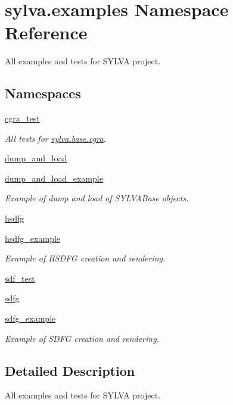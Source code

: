 \hypertarget{namespacesylva_1_1examples}{}\section{sylva.\+examples Namespace Reference}
\label{namespacesylva_1_1examples}


All examples and tests for S\+Y\+L\+VA project.  


\subsection*{Namespaces}
\begin{DoxyCompactItemize}
\item 
 \hyperlink{namespacesylva_1_1examples_1_1cgra__test}{cgra\+\_\+test}
\begin{DoxyCompactList}\small\item\em All tests for \hyperlink{namespacesylva_1_1base_1_1cgra}{sylva.\+base.\+cgra}. \end{DoxyCompactList}\item 
 \hyperlink{namespacesylva_1_1examples_1_1dump__and__load}{dump\+\_\+and\+\_\+load}
\item 
 \hyperlink{namespacesylva_1_1examples_1_1dump__and__load__example}{dump\+\_\+and\+\_\+load\+\_\+example}
\begin{DoxyCompactList}\small\item\em Example of dump and load of S\+Y\+L\+V\+A\+Base objects. \end{DoxyCompactList}\item 
 \hyperlink{namespacesylva_1_1examples_1_1hsdfg}{hsdfg}
\item 
 \hyperlink{namespacesylva_1_1examples_1_1hsdfg__example}{hsdfg\+\_\+example}
\begin{DoxyCompactList}\small\item\em Example of H\+S\+D\+FG creation and rendering. \end{DoxyCompactList}\item 
 \hyperlink{namespacesylva_1_1examples_1_1sdf__test}{sdf\+\_\+test}
\item 
 \hyperlink{namespacesylva_1_1examples_1_1sdfg}{sdfg}
\item 
 \hyperlink{namespacesylva_1_1examples_1_1sdfg__example}{sdfg\+\_\+example}
\begin{DoxyCompactList}\small\item\em Example of S\+D\+FG creation and rendering. \end{DoxyCompactList}\end{DoxyCompactItemize}


\subsection{Detailed Description}
All examples and tests for S\+Y\+L\+VA project. 